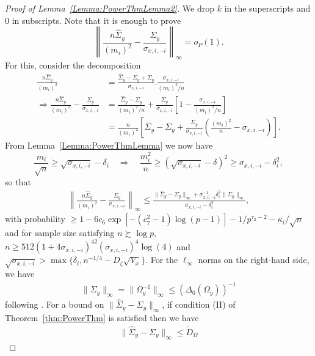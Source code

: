\begin{proof}[Proof of Lemma~\ref{Lemma:PowerThmLemma2}]
We drop $k$ in the superscripts and 0 in subscripts. Note that it is enough to prove
%
$$
\left\| \frac{n \widehat \Sigma_y}{(m_i)^2} - \frac{ \Sigma_y}{\sigma_{x,i,-i}} \right\|_\infty = o_P(1).
$$
%
For this, consider the decomposition
%
\begin{align*}
\frac{n \widehat \Sigma_y}{(m_i)^2} &= \frac{\widehat \Sigma_y - \Sigma_y + \Sigma_y}{\sigma_{x,i,-i}}.
\frac{\sigma_{x,i,-i}}{(m_i)^2/n}\\
\Rightarrow \frac{n \widehat \Sigma_y}{(m_i)^2} - \frac{ \Sigma_y}{\sigma_{x,i,-i}} &=
\frac{\widehat \Sigma_y - \Sigma_y}{(m_i)^2/n} +
\frac{\Sigma_y}{\sigma_{x,i,-i}} \left[ 1 - \frac{\sigma_{x,i,-i}}{(m_i)^2/n} \right]\\
& = \frac{n}{(m_i)^2} \left[ \widehat \Sigma_y - \Sigma_y +
\frac{\Sigma_y}{\sigma_{x,i,-i}} \left( \frac{(m_i)^2}{n} - \sigma_{x,i,-i} \right) \right].
\end{align*}
%
From Lemma~\ref{Lemma:PowerThmLemma} we now have
%
$$
\frac{m_i}{\sqrt n} \geq \sqrt{\sigma_{x,i,-i}} - \delta_i \quad \Rightarrow \quad
\frac{m_i^2}{n} \geq (\sqrt{\sigma_{x,i,-i}} - \delta)^2 \geq \sigma_{x,i,-i} - \delta_i^2,
$$
%
so that
%
\begin{align}\label{eqn:PowerThmLemma2ProofEqn1}
\left\| \frac{n \widehat \Sigma_y}{(m_i)^2} - \frac{ \Sigma_y}{\sigma_{x,i,-i}} \right\|_\infty \leq
\frac{ \| \widehat \Sigma_y - \Sigma_y \|_\infty + \sigma_{x,i,-i}^{-1} \delta_i^2 \| \Sigma_y \|_\infty }{\sigma_{x,i,-i} - \delta_i^2},
\end{align}
%
with probability $\geq 1 - 6c_{6} \exp [-(c_{7}^2-1) \log (p-1)] - 1/p^{\tau_2-2} - \kappa_i / \sqrt n$ and for sample size satisfying $n \succsim \log p$,  $n \geq 512 (1 + 4 \sigma_{x,i,-i})^42 (\sigma_{x,i,-i})^4 \log(4) $ and $\sqrt{ \sigma_{x,i,-i}} > \max \{ \delta_i, n^{-1/4} - D_\zeta \sqrt{V_x} \}$. For the $\ell_\infty$ norms on the right-hand side, we have
%
\begin{align}\label{eqn:PowerThmLemma2ProofEqn2}
\| \Sigma_y \|_\infty = \| \Omega_y^{-1} \|_\infty \leq (\Delta_0 (\Omega_y))^{-1}
\end{align}
%
following \cite{Varah75}. For a bound on $\| \widehat \Sigma_y - \Sigma_y \|_\infty$, if condition (II) of Theorem~\ref{thm:PowerThm} is satisfied then we have
%
\begin{align}\label{eqn:PowerThmLemma2ProofEqn31}
\| \widehat \Sigma_y - \Sigma_y \|_\infty \leq \tilde D_\Omega
\end{align}

\end{proof}
